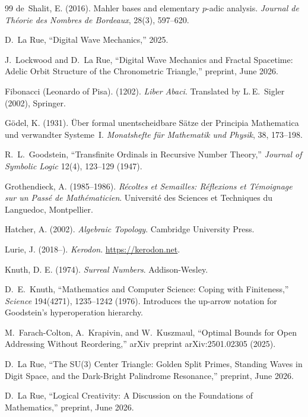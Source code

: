 \begin{thebibliography}{99}
de~Shalit, E. (2016).
Mahler bases and elementary $p$-adic analysis.
\emph{Journal de Th\'eorie des Nombres de Bordeaux}, 28(3), 597--620.

D.~La Rue,
``Digital Wave Mechanics,'' 2025.

J.~Lockwood and D.~La Rue, ``Digital Wave Mechanics and Fractal Spacetime: Adelic Orbit Structure of the Chronometric Triangle,'' preprint, June 2026.

Fibonacci (Leonardo of Pisa). (1202). \emph{Liber Abaci}. Translated by L.\,E.\ Sigler (2002), Springer.

G\"odel, K. (1931). \"Uber formal unentscheidbare S\"atze der Principia Mathematica und verwandter Systeme~I. \emph{Monatshefte f\"ur Mathematik und Physik}, 38, 173--198.

R.~L.~Goodstein,
``Transfinite Ordinals in Recursive Number Theory,''
\emph{Journal of Symbolic Logic} 12(4), 123--129 (1947).

Grothendieck, A. (1985--1986). \emph{R\'ecoltes et Semailles: R\'eflexions et T\'emoignage sur un Pass\'e de Math\'ematicien}. Universit\'e des Sciences et Techniques du Languedoc, Montpellier.

Hatcher, A. (2002). \emph{Algebraic Topology}. Cambridge University Press.

Lurie, J. (2018--). \emph{Kerodon}. \url{https://kerodon.net}.

Knuth, D. E. (1974). \emph{Surreal Numbers}. Addison-Wesley.

D.~E.~Knuth,
``Mathematics and Computer Science: Coping with Finiteness,''
\emph{Science} 194(4271), 1235--1242 (1976).
Introduces the up-arrow notation for Goodstein's hyperoperation hierarchy.

M.~Farach-Colton, A.~Krapivin, and W.~Kuszmaul,
``Optimal Bounds for Open Addressing Without Reordering,''
arXiv preprint arXiv:2501.02305 (2025).

D.~La Rue, ``The SU(3) Center Triangle: Golden Split Primes, Standing Waves in Digit Space, and the Dark-Bright Palindrome Resonance,'' preprint, June 2026.

D.~La Rue, ``Logical Creativity: A Discussion on the Foundations of Mathematics,'' preprint, June 2026.


\end{thebibliography}
